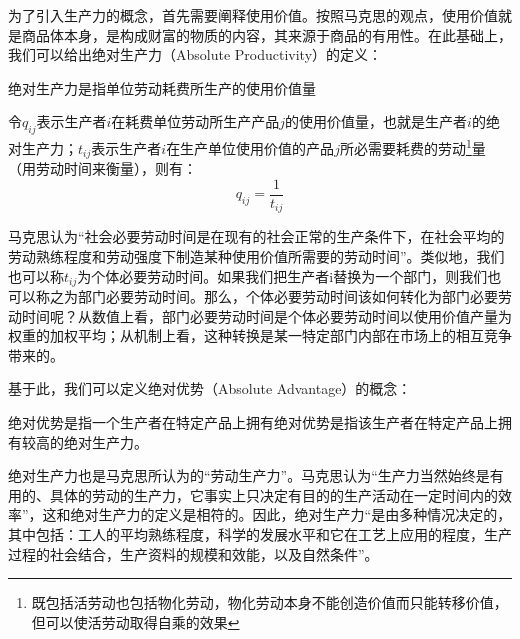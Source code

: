 为了引入生产力的概念，首先需要阐释使用价值。按照马克思的观点，使用价值就是商品体本身，是构成财富的物质的内容，其来源于商品的有用性\cite[48-49]{ZhongGongZhongYangMaKeSiEnGeSiLieNingSiDaLinZhuZuoBianYiJuMaKeSiEnGeSiWenJiDi5Juan2009}。在此基础上，我们可以给出绝对生产力（Absolute Productivity）的定义：

\begin{definition}
    绝对生产力是指单位劳动耗费所生产的使用价值量\cite[47]{CaiJiMingCongXiaYiJieZhiLunDaoGuangYiJieZhiLunXiuDingBan2022}
\end{definition}

令$q_{ij}$表示生产者$i$在耗费单位劳动所生产产品$j$的使用价值量，也就是生产者$i$的绝对生产力；$t_{ij}$表示生产者$i$在生产单位使用价值的产品$j$所必需要耗费的劳动\footnote{既包括活劳动也包括物化劳动，物化劳动本身不能创造价值而只能转移价值，但可以使活劳动取得自乘的效果\cite{ChengEnFuXinDeHuoLaoDongJieZhiYiYuanLunLaoDongJieZhiLiLunDeDangDaiTuoZhan2001}}量（用劳动时间来衡量\cite[51]{ZhongGongZhongYangMaKeSiEnGeSiLieNingSiDaLinZhuZuoBianYiJuMaKeSiEnGeSiWenJiDi5Juan2009}），则有：
\begin{equation}
    \label{jueduishengchanli}
    q_{ij}=\frac{1}{t_{ij}}
\end{equation}

马克思认为“社会必要劳动时间是在现有的社会正常的生产条件下，在社会平均的劳动熟练程度和劳动强度下制造某种使用价值所需要的劳动时间”\cite[52]{ZhongGongZhongYangMaKeSiEnGeSiLieNingSiDaLinZhuZuoBianYiJuMaKeSiEnGeSiWenJiDi5Juan2009}。类似地，我们也可以称$t_{ij}$为个体必要劳动时间。如果我们把生产者i替换为一个部门，则我们也可以称之为部门必要劳动时间。那么，个体必要劳动时间该如何转化为部门必要劳动时间呢？从数值上看，部门必要劳动时间是个体必要劳动时间以使用价值产量为权重的加权平均\cite[53]{LinGangGuanYuSheHuiBiYaoLaoDongShiJianYiJiLaoDongShengChanLuYuJieZhiLiangGuanXiWenTiDeTanTao2005}；从机制上看，这种转换是某一特定部门内部在市场上的相互竞争带来的。

基于此，我们可以定义绝对优势（Absolute Advantage）的概念：

\begin{definition}
    绝对优势是指一个生产者在特定产品上拥有绝对优势是指该生产者在特定产品上拥有较高的绝对生产力。
\end{definition}

绝对生产力也是马克思所认为的“劳动生产力”。马克思认为“生产力当然始终是有用的、具体的劳动的生产力，它事实上只决定有目的的生产活动在一定时间内的效率”\cite[59]{ZhongGongZhongYangMaKeSiEnGeSiLieNingSiDaLinZhuZuoBianYiJuMaKeSiEnGeSiWenJiDi5Juan2009}，这和绝对生产力的定义是相符的。因此，绝对生产力“是由多种情况决定的，其中包括：工人的平均熟练程度，科学的发展水平和它在工艺上应用的程度，生产过程的社会结合，生产资料的规模和效能，以及自然条件”\cite[53]{ZhongGongZhongYangMaKeSiEnGeSiLieNingSiDaLinZhuZuoBianYiJuMaKeSiEnGeSiWenJiDi5Juan2009}。

